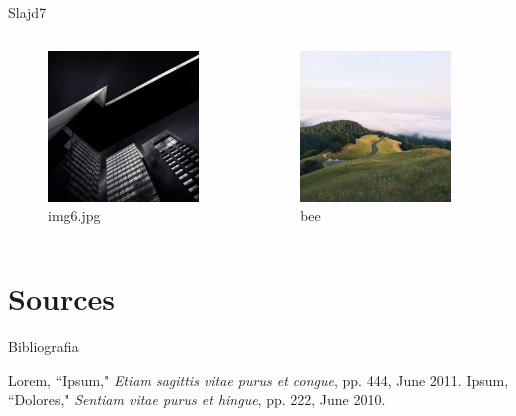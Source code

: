 \documentclass{beamer}
\begin{document}
\begin{frame}{Slajd7}
	\begin{columns}
		\begin{figure}
			\hspace*{-3cm}
			\includegraphics[width=4cm]{img6.jpg}
			\caption{img6.jpg}
		\end{figure}
		
		\begin{figure}
			\caption{bee}
			\hspace*{-2cm}
			\includegraphics[width=4cm]{img7.jpg}
			
		\end{figure}
	\end{columns}
\end{frame}

\section{Sources}
\begin{frame}{Bibliografia}
\begin{thebibliography}{10}
	Lorem, ``Ipsum," \emph{Etiam sagittis vitae purus et congue}, pp. 444, June 2011.
	Ipsum, ``Dolores," \emph{Sentiam vitae purus et hingue}, pp. 222, June 2010.
\end{thebibliography}
\end{frame}
\end{document}
